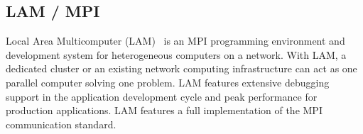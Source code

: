 \subsection*{LAM / MPI}

Local Area Multicomputer (LAM)~\cite{LAM}
is an MPI programming environment and development system for heterogeneous 
computers on a network. 
With LAM, a dedicated cluster or an existing network
computing infrastructure can act as one parallel computer solving
one problem.  LAM features extensive debugging support in the
application development cycle and peak performance for production
applications. LAM features a full implementation of the MPI
communication standard.

%
%
%
%
%
%
%
%
%
%
%
%
